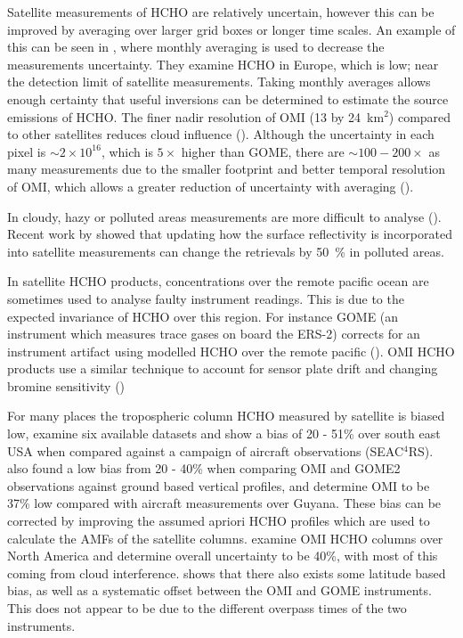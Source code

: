       Satellite measurements of HCHO are relatively uncertain, however this can be improved by averaging over larger grid boxes or longer time scales.
      An example of this can be seen in \cite{Dufour2009}, where monthly averaging is used to decrease the measurements uncertainty.
      They examine HCHO in Europe, which is low; near the detection limit of satellite measurements.
      Taking monthly averages allows enough certainty that useful inversions can be determined to estimate the source emissions of HCHO.
      The finer nadir resolution of OMI (13 by 24~km${^2}$) compared to other satellites reduces cloud influence (\cite{Millet2006, Millet2008}). 
      Although the uncertainty in each pixel is $\sim 2 \times 10^{16}$, which is $5 \times$ higher than GOME, there are $\sim 100-200 \times $ as many measurements due to the smaller footprint and better temporal resolution of OMI, which allows a greater reduction of uncertainty with averaging (\cite{Chance2002,Millet2008}).
      
      In cloudy, hazy or polluted areas measurements are more difficult to analyse (\cite[e.g.][]{Palmer2003,Marais2014}).
      Recent work by \cite{Vasilkov2017} showed that updating how the surface reflectivity is incorporated into satellite measurements can change the retrievals by 50~\% in polluted areas.
      
      In satellite HCHO products, concentrations over the remote pacific ocean are sometimes used to analyse faulty instrument readings.
      This is due to the expected invariance of HCHO over this region.
      For instance GOME (an instrument which measures trace gases on board the ERS-2) corrects for an instrument artifact using modelled HCHO over the remote pacific (\cite{Shim2005}).
      OMI HCHO products use a similar technique to account for sensor plate drift and changing bromine sensitivity (\cite{Abad2015})
      
      
      For many places the tropospheric column HCHO measured by satellite is biased low, \cite{Zhu2016} examine six available datasets and show a bias of 20 - 51\% over south east USA when compared against a campaign of aircraft observations (SEAC$^4$RS).
      \cite{DeSmedt2015} also found a low bias from 20 - 40\% when comparing OMI and GOME2 observations against ground based vertical profiles, and \cite{Barkley2013} determine OMI to be 37\% low compared with aircraft measurements over Guyana.
      These bias can be corrected by improving the assumed apriori HCHO profiles which are used to calculate the AMFs of the satellite columns.
      \cite{Millet2006} examine OMI HCHO columns over North America and determine overall uncertainty to be 40\%, with most of this coming from cloud interference.
      \cite{Millet2008} shows that there also exists some latitude based bias, as well as a systematic offset between the OMI and GOME instruments.
      This does not appear to be due to the different overpass times of the two instruments.
      
